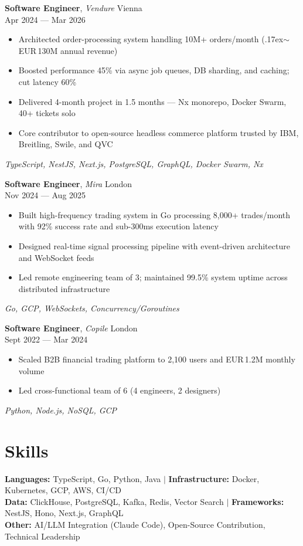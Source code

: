 \documentclass[a4paper,10pt]{article}
\newcommand{\entry}[4]{%
  \textbf{#1}, \textit{#2} \hfill #3 \\ \vspace{-2pt}
  {\small #4}%
}
\begin{document}
\vspace{4pt}
\entry{Software Engineer}{Vendure}{Vienna}{Apr 2024 --- Mar 2026}
\begin{itemize}
  \item Architected order-processing system handling 10M+ orders/month ({\raise.17ex\hbox{$\scriptstyle\sim$}}EUR\,130M annual revenue)
  \item Boosted performance 45\% via async job queues, DB sharding, and caching; cut latency 60\%
  \item Delivered 4-month project in 1.5 months --- Nx monorepo, Docker Swarm, 40+ tickets solo
  \item Core contributor to open-source headless commerce platform trusted by IBM, Breitling, Swile, and QVC
\end{itemize}
{\small\textit{TypeScript, NestJS, Next.js, PostgreSQL, GraphQL, Docker Swarm, Nx}}

\vspace{4pt}
\entry{Software Engineer}{Mira}{London}{Nov 2024 --- Aug 2025}
\begin{itemize}
  \item Built high-frequency trading system in Go processing 8,000+ trades/month with 92\% success rate and sub-300ms execution latency
  \item Designed real-time signal processing pipeline with event-driven architecture and WebSocket feeds
  \item Led remote engineering team of 3; maintained 99.5\% system uptime across distributed infrastructure
\end{itemize}
{\small\textit{Go, GCP, WebSockets, Concurrency/Goroutines}}

\vspace{4pt}
\entry{Software Engineer}{Copile}{London}{Sept 2022 --- Mar 2024}
\begin{itemize}
  \item Scaled B2B financial trading platform to 2,100 users and EUR\,1.2M monthly volume
  \item Led cross-functional team of 6 (4 engineers, 2 designers)
\end{itemize}
{\small\textit{Python, Node.js, NoSQL, GCP}}

\section{Skills}
{\small
\textbf{Languages:} TypeScript, Go, Python, Java \enspace$\vert$\enspace
\textbf{Infrastructure:} Docker, Kubernetes, GCP, AWS, CI/CD \\
\textbf{Data:} ClickHouse, PostgreSQL, Kafka, Redis, Vector Search \enspace$\vert$\enspace
\textbf{Frameworks:} NestJS, Hono, Next.js, GraphQL \\
\textbf{Other:} AI/LLM Integration (Claude Code), Open-Source Contribution, Technical Leadership
}
\end{document}
